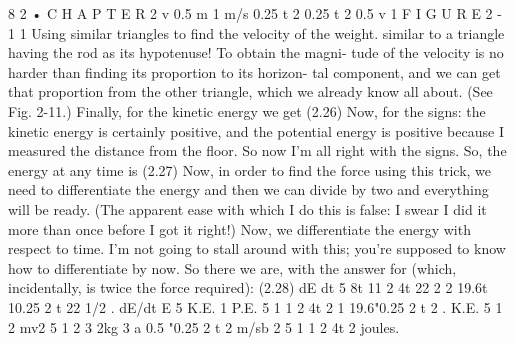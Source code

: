 \documentclass[10pt,oneside]{article}
\begin{document}
8 2 • C H A P T E R  2 v 0.5 m 1 m/s 0.25   t 2 0.25   t 2 0.5 v 1 F I G U R E  2 - 1 1 Using similar triangles to find the velocity of the weight. similar to a triangle having the rod as its hypotenuse! To obtain the magni- tude of the velocity is no harder than finding its proportion to its horizon- tal component, and we can get that proportion from the other triangle, which we already know all about. (See Fig. 2-11.) Finally, for the kinetic energy we get (2.26) Now, for the signs: the kinetic energy is certainly positive, and the potential energy is positive because I measured the distance from the floor. So now I’m all right with the signs. So, the energy at any time is (2.27) Now, in order to find the force using this trick, we need to differentiate the energy and then we can divide by two and everything will be ready. (The apparent ease with which I do this is false: I swear I did it more than once before I got it right!) Now, we differentiate the energy with respect to time. I’m not going to stall around with this; you’re supposed to know how to differentiate by now. So there we are, with the answer for (which, incidentally, is twice the force required): (2.28) dE dt 5 8t 11 2 4t 22 2 2 19.6t 10.25 2 t 22 1/2 . dE/dt E 5 K.E. 1 P.E. 5 1 1 2 4t 2 1 19.6"0.25 2 t 2 . K.E. 5 1 2 mv2 5 1 2 3 2kg 3 a 0.5 "0.25 2 t 2 m/sb 2 5 1 1 2 4t 2 joules.\par
\end{document}
